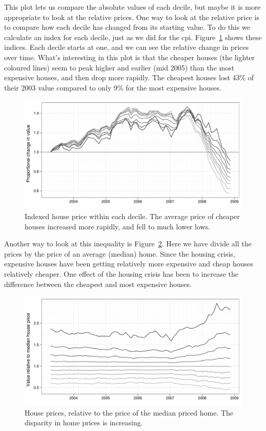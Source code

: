 \documentclass[oneside]{article}
\begin{document}
This plot lets us compare the absolute values of each decile, but maybe it is more appropriate to look at the relative prices.  One way to look at the relative price is to compare how each decile has changed from its starting value.  To do this we calculate an index for each decile, just as we did for the {\sc cpi}. Figure~\ref{fig:decile-ind} shows these indices.  Each decile starts at one, and we can see the relative change in prices over time.  What's interesting in this plot is that the cheaper houses (the lighter coloured lines) seem to peak higher and earlier (mid 2005) than the most expensive houses, and then drop more rapidly.  The cheapest houses lost 43\% of their 2003 value compared to only 9\% for the most expensive houses.

\begin{figure}[htbp]
  \centering
  \includegraphics[width=0.75\linewidth]{decile-ind}
  \caption{Indexed house price within each decile.  The average price of cheaper houses increased more rapidly, and fell to much lower lows.}
  \label{fig:decile-ind}
\end{figure}

Another way to look at this inequality is Figure~\ref{fig:decile-rel}.  Here we have divide all the prices by the price of an average (median) home.  Since the housing crisis, expensive houses have been getting relatively more expensive and cheap houses relatively cheaper.  One effect of the housing crisis has been to increase the difference between the cheapest and most expensive houses.

\begin{figure}[htbp]
  \centering
  \includegraphics[width=0.75\linewidth]{decile-rel}
  \caption{House prices, relative to the price of the median priced home.  The disparity in home prices is increasing.}
  \label{fig:decile-rel}
\end{figure}
\end{document}
